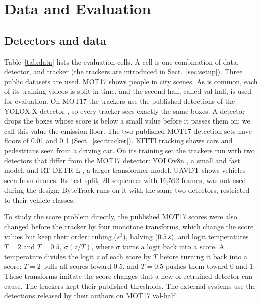 \section{Data and Evaluation}\label{sec:data-eval}

\subsection{Detectors and data}\label{sec:data}
Table~\ref{tab:data} lists the evaluation cells. A cell is one combination of
data, detector, and tracker (the trackers are introduced in
Sect.~\ref{sec:setup}). Three public datasets are used. MOT17
\cite{milan2016mot16} shows people in city scenes. As is common, each of its
training videos is split in time, and the second half, called val-half, is
used for evaluation. On MOT17 the trackers use the published detections of
the YOLOX-X detector \cite{ge2021yolox}, so every tracker sees exactly the
same boxes. A detector drops the boxes whose score is below a small value
before it passes them on; we call this value the emission floor. The two
published MOT17 detection sets have floors of 0.01 and 0.1
(Sect.~\ref{sec:tracker}). KITTI tracking \cite{geiger2012kitti} shows cars
and pedestrians seen from a driving car. On its training set the trackers run
with two detectors that differ from the MOT17 detector: YOLOv8n
\cite{jocher2023yolov8}, a small and fast model, and RT-DETR-L
\cite{zhao2024rtdetr}, a larger transformer model. UAVDT \cite{du2018uavdt}
shows vehicles seen from drones. Its test split, 20 sequences with 16,592
frames, was not used during the design; ByteTrack runs on it with the same two
detectors, restricted to their vehicle classes.

To study the score problem directly, the published MOT17 scores were also
changed before the tracker by four monotone transforms, which change the
score values but keep their order: cubing ($s^3$), halving ($0.5\,s$), and
logit temperatures $T=2$ and $T=0.5$, $\sigma(z/T)$, where $\sigma$ turns a
logit back into a score. A temperature divides the logit $z$ of each score by
$T$ before turning it back into a score: $T=2$ pulls all scores toward 0.5,
and $T=0.5$ pushes them toward 0 and 1. These transforms imitate the score
changes that a new or retrained detector can cause. The trackers kept their
published thresholds. The external systems use the detections released by
their authors on MOT17 val-half.



